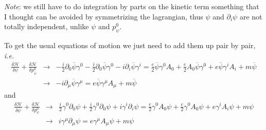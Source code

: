 \documentclass[aps,preprint,preprintnumbers,nofootinbib,showpacs,prd]{revtex4-1}
\newcommand{\ie}{{\it i.e.} }
\newcommand{\nbea}{\begin{eqnarray*}}
\newcommand{\neea}{\end{eqnarray*}}
\begin{document}
{\it Note}: we still have to do integration by parts on the kinetic term something that I thought can be avoided by symmetrizing the lagrangian, thus $\psi$ and $\partial_i \psi$ are not totally independent, unlike $\psi$ and $p^0_{\psi}$.

To get the usual equations of motion we just need to add them up pair by pair, \ie
%
\nbea
\frac{\delta \mathcal{H}}{\delta \psi} + \frac{\delta \mathcal{H}}{\delta p^0_{\overline \psi}} & \rightarrow & -\frac{i}{2} \partial_0 \overline \psi \gamma^0 - \frac{ i}{2} \partial_0 \overline \psi \gamma^0 - i \partial_i \overline \psi \gamma^i = \frac{e}{2} \overline \psi \gamma^0 A_0 + \frac{e}{2} A_0 \overline \psi \gamma^0 + e \overline \psi \gamma^i A_i+ m \overline \psi \\
& \rightarrow & - i \partial_\mu \overline \psi \gamma^\mu = e \overline \psi \gamma^\mu A_\mu+ m \overline \psi 
\neea
%
and
%
\nbea
\frac{\delta \mathcal{H}}{\delta \overline \psi} + \frac{\delta \mathcal{H}}{\delta p^0_\psi} & \rightarrow & \frac{i}{2} \gamma^0 \partial_0 \psi + \frac{i}{2} \gamma^0 \partial_0 \psi + i \gamma^i \partial_i \psi = \frac{e}{2} \gamma^0 A_0 \psi + \frac{e}{2} \gamma^0 A_0 \psi + e \gamma^i A_i \psi + m \psi \\
& \rightarrow & i \gamma^\mu \partial_\mu \psi = e \gamma^\mu A_\mu \psi + m \psi
\neea
%
\end{document}
